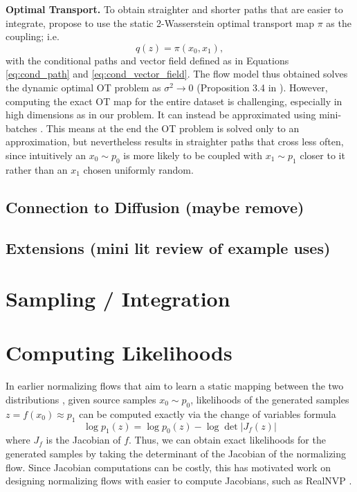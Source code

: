 \textbf{Optimal Transport.} To obtain straighter and shorter paths that are easier to integrate, \citet{tongImprovingGeneralizingFlowbased2023} propose to use the static 2-Wasserstein optimal transport map $\pi$ as the coupling; i.e.
\begin{equation}
    q(z) = \pi(x_0, x_1),
\end{equation}
with the conditional paths and vector field defined as in Equations \ref{eq:cond_path} and \ref{eq:cond_vector_field}. The flow model thus obtained solves the dynamic optimal OT problem as $\sigma^2 \to 0$ (Proposition 3.4 in \citep{tongImprovingGeneralizingFlowbased2023}). However, computing the exact OT map for the entire dataset is challenging, especially in high dimensions as in our problem. It can instead be approximated using mini-batches \citep{fatrasMinibatchOptimalTransport2021}. This means at the end the OT problem is solved only to an approximation, but nevertheless results in straighter paths that cross less often, since intuitively an $x_0 \sim p_0$ is more likely to be coupled with $x_1 \sim p_1$ closer to it rather than an $x_1$ chosen uniformly random.

\subsection{Connection to Diffusion (maybe remove)}

\subsection{Extensions (mini lit review of example uses)}

\section{Sampling / Integration} \label{section:sampling_integration}

\section{Computing Likelihoods} \label{section:computing_likelihoods}

In earlier normalizing flows that aim to learn a static mapping between the two distributions \citep{rezendeVariationalInferenceNormalizing2015}, given source samples $x_0 \sim p_0$, likelihoods of the generated samples $z = f(x_0) \approx p_1$  can be computed exactly via the change of variables formula
\begin{equation} \label{eq:static_cov}
    \log p_1(z) = \log p_0(z) - \log \det \left\vert J_f(z) \right\vert
\end{equation}
where $J_f$ is the Jacobian of $f$. Thus, we can obtain exact likelihoods for the generated samples by taking the determinant of the Jacobian of the normalizing flow. Since Jacobian computations can be costly, this has motivated work on designing normalizing flows with easier to compute Jacobians, such as RealNVP \citep{dinhDensityEstimationUsing2017}. 

